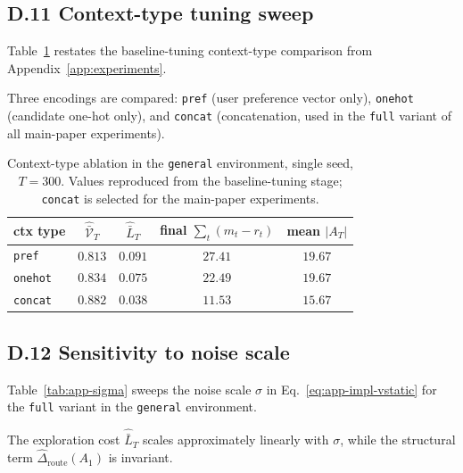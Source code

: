 \documentclass{article} %
\begin{document}
\subsection{D.11 Context-type tuning sweep}

\label{app:tab-ctx}

Table~\ref{tab:app-ctx} restates the baseline-tuning context-type comparison from Appendix~\ref{app:experiments}.

Three encodings are compared: \texttt{pref} (user preference vector only), \texttt{onehot} (candidate one-hot only), and \texttt{concat} (concatenation, used in the \texttt{full} variant of all main-paper experiments).

\begin{table}[h]
\centering
\small
\begin{tabular}{lcccc}
\toprule
ctx type & $\widehat{\bar{\mathcal V}}_T$ & $\widehat{\bar L}_T$ & final $\sum_t(m_t-r_t)$ & mean $|A_T|$ \\
\midrule
\texttt{pref}   & $0.813$ & $0.091$ & $27.41$ & $19.67$ \\
\texttt{onehot} & $0.834$ & $0.075$ & $22.49$ & $19.67$ \\
\texttt{concat} & $0.882$ & $0.038$ & $11.53$ & $15.67$ \\
\bottomrule
\end{tabular}
\caption{Context-type ablation in the \texttt{general} environment, single seed, $T=300$. Values reproduced from the baseline-tuning stage; \texttt{concat} is selected for the main-paper experiments.}
\label{tab:app-ctx}
\end{table}

\subsection{D.12 Sensitivity to noise scale}

\label{app:tab-sigma}

Table~\ref{tab:app-sigma} sweeps the noise scale $\sigma$ in Eq.~\eqref{eq:app-impl-vstatic} for the \texttt{full} variant in the \texttt{general} environment.

The exploration cost $\widehat{\bar L}_T$ scales approximately linearly with $\sigma$, while the structural term $\widehat\Delta_{\mathrm{route}}(A_1)$ is invariant.
\end{document}

